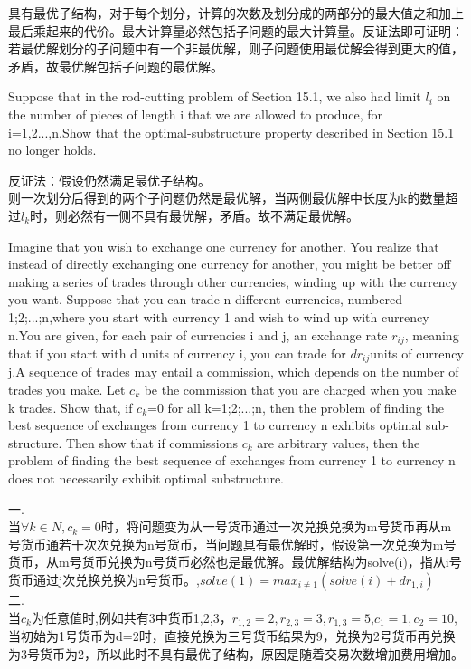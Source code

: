 \documentclass[a4paper, justified]{tufte-handout}
\begin{document}
\begin{solution}
具有最优子结构，对于每个划分，计算的次数及划分成的两部分的最大值之和加上最后乘起来的代价。最大计算量必然包括子问题的最大计算量。反证法即可证明：若最优解划分的子问题中有一个非最优解，则子问题使用最优解会得到更大的值，矛盾，故最优解包括子问题的最优解。
\end{solution}

\begin{problem}[TC 15.3-5]
Suppose that in the rod-cutting problem of Section 15.1, we also had limit $l_i$ on the number of pieces of length i that we are allowed to produce, for i=1,2...,n.Show that the optimal-substructure  property described in Section 15.1 no longer holds.
\end{problem}

\begin{solution}
反证法：假设仍然满足最优子结构。\\
则一次划分后得到的两个子问题仍然是最优解，当两侧最优解中长度为k的数量超过$l_k$时，则必然有一侧不具有最优解，矛盾。故不满足最优解。
\end{solution}

\begin{problem}[TC 15.3-6]
Imagine  that  you  wish  to  exchange  one  currency  for  another.   You  realize  that instead of directly exchanging one currency for another,  you might be better off making a series of trades through other currencies, winding up with the currency you want. Suppose that you can trade n different currencies, numbered 1;2;...;n,where you start with currency 1 and wish to wind up with currency n.You are given,  for each pair of currencies i and j, an exchange rate $r_{ij}$, meaning that if you start with d units of currency i, you can trade for $dr_{ij}$units of currency j.A sequence of trades may entail a commission, which depends on the number of trades you make. Let $c_k$ be the commission that you are charged when you make k trades. Show that, if $c_k$=0 for all k=1;2;...;n, then the problem of finding the best sequence of exchanges from currency 1 to currency n exhibits optimal sub-structure. Then show that if commissions $c_k$ are arbitrary values, then the problem of finding the best sequence of exchanges from currency 1 to currency n does not necessarily exhibit optimal substructure.
\end{problem}

\begin{solution}
一.\\
当$\forall k\in N, c_k=0$时，将问题变为从一号货币通过一次兑换兑换为m号货币再从m号货币通若干次次兑换为n号货币，当问题具有最优解时，假设第一次兑换为m号货币，从m号货币兑换为n号货币必然也是最优解。最优解结构为solve(i)，指从i号货币通过j次兑换兑换为n号货币。,$solve(1)=max_{i\neq 1}(solve(i)+dr_{1,i})$\\
二.\\
当$c_k$为任意值时,例如共有3中货币1,2,3，$r_{1,2}=2,r_{2,3}=3,r_{1,3}=5$,$c_1=1,c_2=10$,当初始为1号货币为d=2时，直接兑换为三号货币结果为9，兑换为2号货币再兑换为3号货币为2，所以此时不具有最优子结构，原因是随着交易次数增加费用增加。
\end{solution}
\end{document}
